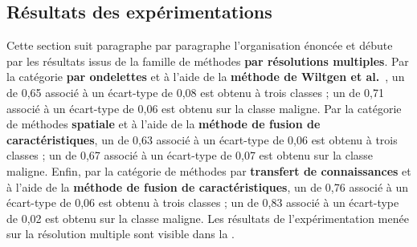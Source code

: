 \subsection{Résultats des expérimentations}
Cette section suit paragraphe par paragraphe l'organisation énoncée et débute par les résultats issus de la famille de méthodes \textbf{par résolutions multiples}. Par la catégorie \textbf{par ondelettes} et à l'aide de la \textbf{méthode de Wiltgen et al.}~\cite{Wiltgen2008}, un \fscore{} de 0,65 associé à un écart-type de 0,08 est obtenu à trois classes ; un \fscore{} de 0,71 associé à un écart-type de 0,06 est obtenu sur la classe maligne. Par la catégorie de méthodes \textbf{spatiale} et à l'aide de la \textbf{méthode de fusion de caractéristiques}, un \fscore{} de 0,63 associé à un écart-type de 0,06 est obtenu à trois classes ; un \fscore{} de 0,67 associé à un écart-type de 0,07 est obtenu sur la classe maligne. Enfin, par la catégorie de méthodes par \textbf{transfert de connaissances} et à l'aide de la \textbf{méthode de fusion de caractéristiques}, un \fscore{} de 0,76 associé à un écart-type de 0,06 est obtenu à trois classes ; un \fscore{} de 0,83 associé à un écart-type de 0,02 est obtenu sur la classe maligne. Les résultats de l'expérimentation menée sur la résolution multiple sont visible dans la .\par

